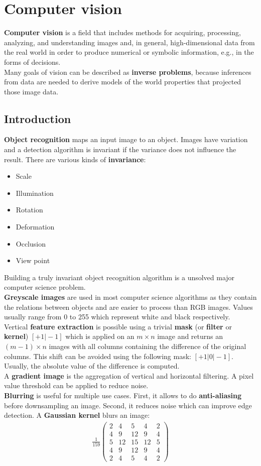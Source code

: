 \documentclass{report}
\begin{document}
\chapter{Computer vision}
{\bf Computer vision} is a field that includes methods for acquiring, processing, analyzing, and understanding images and, in general, high-dimensional data from the real world in order to produce numerical or symbolic information, e.g., in the forms of decisions. \\
Many goals of vision can be described as {\bf inverse problems}, because inferences from data are needed to derive models of the world properties that projected those image data.

\section{Introduction}
\label{chapter:cvinvariances}
{\bf Object recognition} maps an input image to an object. Images have variation and a detection algorithm is invariant if the variance does not influence the result. There are various kinds of {\bf invariance}:
\begin{itemize}
\item Scale
\item Illumination
\item Rotation
\item Deformation
\item Occlusion
\item View point
\end{itemize}
Building a truly invariant object recognition algorithm is a unsolved major computer science problem.
\\
{\bf Greyscale images} are used in most computer science algorithms as they contain the relations between objects and are easier to process than RGB images. Values usually range from 0 to 255 which represent white and black respectively. \\
Vertical {\bf feature extraction} is possible using a trivial {\bf mask} (or {\bf filter} or {\bf kernel}) $[+1\vert -1]$ which is applied on an $m\times n$ image and returns an $(m-1)\times n$ images with all columns containing the difference of the original columns. This shift can be avoided using the following mask: $[+1\vert 0\vert -1]$.
Usually, the absolute value of the difference is computed. \\
A {\bf gradient image} is the aggregation of vertical and horizontal filtering. A pixel value threshold can be applied to reduce noise. \\
{\bf Blurring} is useful for multiple use cases. First, it allows to do {\bf anti-aliasing} before downsampling an image. Second, it reduces noise which can improve edge detection. A {\bf Gaussian kernel} blurs an image:
\begin{align*}
\frac{1}{159} \begin{pmatrix}
2 & 4 & 5 & 4 & 2 \\
4 & 9 & 12 & 9 & 4 \\
5 & 12 & 15 & 12 & 5 \\
4 & 9 & 12 & 9 & 4 \\
2 & 4 & 5 & 4 & 2
\end{pmatrix}
\end{align*}
\end{document}

